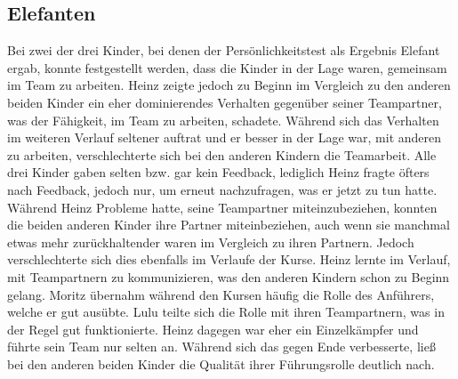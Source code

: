 \subsection{Elefanten}
Bei zwei der drei Kinder, bei denen der Persönlichkeitstest als Ergebnis Elefant ergab, konnte festgestellt werden, dass die Kinder in der Lage waren, gemeinsam im Team zu arbeiten. Heinz zeigte jedoch zu Beginn im Vergleich zu den anderen beiden Kinder ein eher dominierendes Verhalten gegenüber seiner Teampartner, was der Fähigkeit, im Team zu arbeiten, schadete. Während sich das Verhalten im weiteren Verlauf seltener auftrat und er besser in der Lage war, mit anderen zu arbeiten, verschlechterte sich bei den anderen Kindern die Teamarbeit. Alle drei Kinder gaben selten bzw. gar kein Feedback, lediglich Heinz fragte öfters nach Feedback, jedoch nur, um erneut nachzufragen, was er jetzt zu tun hatte. Während Heinz Probleme hatte, seine Teampartner miteinzubeziehen, konnten die beiden anderen Kinder ihre Partner miteinbeziehen, auch wenn sie manchmal etwas mehr zurückhaltender waren im Vergleich zu ihren Partnern. Jedoch verschlechterte sich dies ebenfalls im Verlaufe der Kurse. Heinz lernte im Verlauf, mit Teampartnern zu kommunizieren, was den anderen Kindern schon zu Beginn gelang. Moritz übernahm während den Kursen häufig die Rolle des Anführers, welche er gut ausübte. Lulu teilte sich die Rolle mit ihren Teampartnern, was in der Regel gut funktionierte. Heinz dagegen war eher ein Einzelkämpfer und führte sein Team nur selten an. Während sich das gegen Ende verbesserte, ließ bei den anderen beiden Kinder die Qualität ihrer Führungsrolle deutlich nach.

